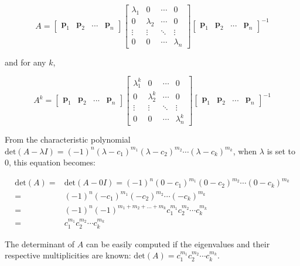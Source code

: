 \documentclass{article}
\begin{document}
\[A = \begin{bmatrix} \mathbf{p}_1 & \mathbf{p}_2 & ... & \mathbf{p}_n \end{bmatrix}\begin{bmatrix} \lambda_1 & 0 & \cdots & 0 \\ 0 & \lambda_2 & \cdots & 0 \\ \vdots & \vdots & \ddots & \vdots \\ 0 & 0 & \cdots & \lambda_n \end{bmatrix}\begin{bmatrix} \mathbf{p}_1 & \mathbf{p}_2 & ... & \mathbf{p}_n \end{bmatrix}^{-1}\]

and for any \(k\), 

\[A^k = \begin{bmatrix} \mathbf{p}_1 & \mathbf{p}_2 & ... & \mathbf{p}_n \end{bmatrix}\begin{bmatrix} \lambda_1^k & 0 & \cdots & 0 \\ 0 & \lambda_2^k & \cdots & 0 \\ \vdots & \vdots & \ddots & \vdots \\ 0 & 0 & \cdots & \lambda_n^k \end{bmatrix}\begin{bmatrix} \mathbf{p}_1 & \mathbf{p}_2 & ... & \mathbf{p}_n \end{bmatrix}^{-1}\]


\vspace{5mm}

From the characteristic polynomial \(\text{det}(A - \lambda I) = (-1)^n(\lambda - c_1)^{m_1}(\lambda - c_2)^{m_2} \cdots (\lambda - c_k)^{m_k}\), when \(\lambda\) is set to \(0\), this equation becomes:

\begin{align*}
\text{det}(A) 
= & \text{det}(A - 0I) 
= (-1)^n(0 - c_1)^{m_1}(0 - c_2)^{m_2} \cdots (0 - c_k)^{m_k} \\
= & (-1)^n(-c_1)^{m_1}(-c_2)^{m_2} \cdots (-c_k)^{m_k} \\
= & (-1)^n(-1)^{m_1 + m_2 + ... + m_k}c_1^{m_1} c_2^{m_2} \cdots c_k^{m_k} \\
= & c_1^{m_1} c_2^{m_2} \cdots c_k^{m_k}
\end{align*}

The determinant of \(A\) can be easily computed if the eigenvalues and their respective multiplicities are known: \(\text{det}(A) = c_1^{m_1} c_2^{m_2} \cdots c_k^{m_k}\).  
\end{document}
